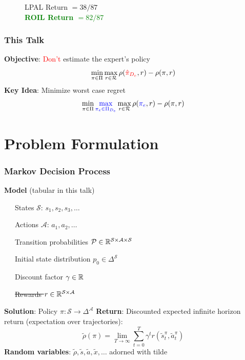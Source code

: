 \documentclass{beamer}
\begin{document}
\begin{frame}
\begin{figure}
\begin{center}
\begin{minipage}{0.45\linewidth}
    LPAL Return $= 38/87$ \\
    \textcolor{green}{\textbf{ROIL Return $= 82/87$}}
  \end{minipage}
  \end{center}
\end{figure}
\end{frame}

\begin{frame}
	\frametitle{This Talk}
	\textbf{Objective}: \textcolor{red}{Don't} estimate the expert's policy
	\[
		\min_{\pi \in \Pi} \max_{r \in \mathcal{R}} \rho(\textcolor{red}{\hat{\pi}_{D_e}}, r) - \rho(\pi, r)
	\]
	\vfill
	\textbf{Key Idea}: Minimize worst case regret
	\[
		\min_{\pi \in \Pi} \textcolor{blue}{\max_{\pi_e \in \Pi_{D_e}}} \max_{r \in \mathcal{R}} \rho(\textcolor{blue}{\pi_e}, r) - \rho(\pi, r)
	\]
\end{frame}

\section*{Problem Formulation}

\begin{frame} \frametitle{Markov Decision Process}
  \textbf{Model} (tabular in this talk) \par
    {\small
   ~~~States $\mathcal{S}$: $s_1, s_2, s_3, \dots $ \par
   ~~~Actions $\mathcal{A}$: $a_1, a_2, \dots $ \par
   ~~~Transition probabilities $\mathcal{P} \in \mathbb{R}^{\mathcal{S} \times \mathcal{A} \times \mathcal{S} }$ \par
   ~~~Initial state distribution $p_0 \in \Delta^\mathcal{S}$ \par
   ~~~Discount factor $\gamma \in \mathbb{R}$ \par
   ~~~\sout{Rewards $r \in \mathbb{R}^{\mathcal{S} \times \mathcal{A}}$}}
    \vfill 
    \textbf{Solution}: Policy ${\pi}\colon \mathcal{S} \to \Delta^\mathcal{A}$
    \vfill
    \textbf{Return}: Discounted expected infinite horizon return (expectation over trajectories):
    \[
	    \tilde{\rho}(\pi) = \lim_{T \to \infty} \sum_{t=0}^T \gamma^t r(\tilde{s}^{\pi}_t, \tilde{a}^{{\pi}}_t)
    \]
    \vfill
    \textbf{Random variables}: $\tilde{\rho}, \tilde{s}, \tilde{a}, \tilde{x}, \dots $ adorned with tilde
\end{frame}
\end{document}
